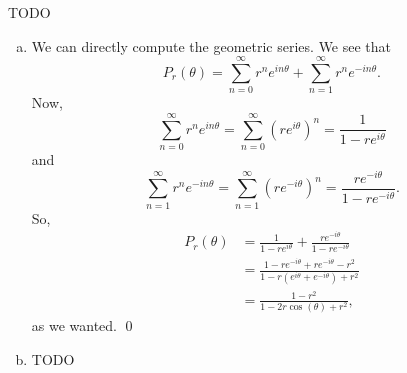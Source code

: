 \documentclass{article}
\begin{document}
\newpage
{} TODO
 \tri
\hop 
\solution
\begin{enumerate}[(a)]
    \item We can directly compute the geometric series. We see that 
    \[P_r(\theta) = \sum_{n=0}^\infty r^n e^{in\theta} + \sum_{n=1}^\infty r^n e^{-in\theta}.\]
    Now,
    \[\sum_{n=0}^\infty r^n e^{in\theta} = \sum_{n=0}^\infty (re^{i\theta})^n = \frac{1}{1-re^{i\theta}}\]
    and
    \[\sum_{n=1}^\infty r^n e^{-in\theta} = \sum_{n=1}^\infty (re^{-i\theta})^n = \frac{re^{-i\theta}}{1-re^{-i\theta}}.\]
    So,
    \begin{align*}
        P_r(\theta) &= \frac{1}{1-re^{i\theta}}+\frac{re^{-i\theta}}{1-re^{-i\theta}} \\
        &= \frac{1-re^{-i\theta}+re^{-i\theta} - r^2}{1-r(e^{i\theta} + e^{-i\theta}) + r^2} \\
        &= \frac{1-r^2}{1-2r\cos(\theta) + r^2},
    \end{align*}
    as we wanted. \qed
    \item TODO
\end{enumerate}
\end{document}
